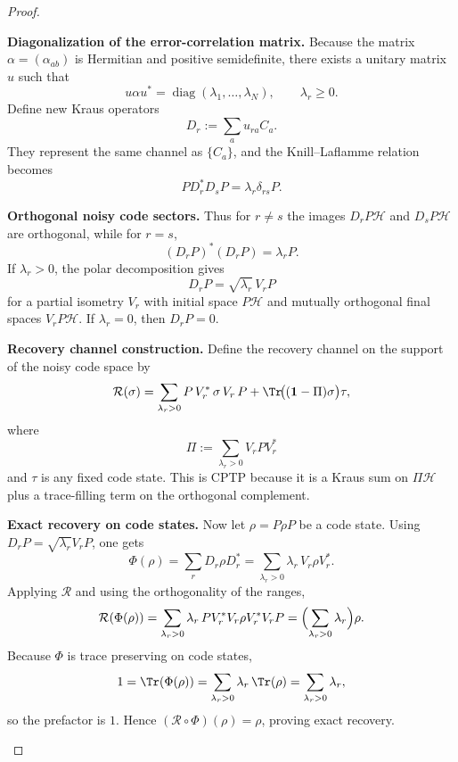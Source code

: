 \documentclass[12pt,a4paper]{article}
\begin{document}
\begin{proof}
\begin{proofsteps}

\item \textbf{Diagonalization of the error-correlation matrix.}
Because the matrix \(\alpha=(\alpha_{ab})\) is Hermitian and positive semidefinite, there exists a unitary matrix \(u\) such that
\[
u\alpha u^*=\operatorname{diag}(\lambda_1,\dots,\lambda_N),
\qquad
\lambda_r\ge 0.
\]
Define new Kraus operators
\[
D_r:=\sum_a u_{ra}C_a.
\]
They represent the same channel as \(\{C_a\}\), and the Knill--Laflamme relation becomes
\[
PD_r^*D_sP=\lambda_r\delta_{rs}P.
\]

\item \textbf{Orthogonal noisy code sectors.}
Thus for \(r\neq s\) the images \(D_rP\mathcal H\) and \(D_sP\mathcal H\) are orthogonal, while for \(r=s\),
\[
(D_rP)^*(D_rP)=\lambda_r P.
\]
If \(\lambda_r>0\), the polar decomposition gives
\[
D_rP=\sqrt{\lambda_r}\,V_rP
\]
for a partial isometry \(V_r\) with initial space \(P\mathcal H\) and mutually orthogonal final spaces \(V_rP\mathcal H\).
If \(\lambda_r=0\), then \(D_rP=0\).


\item \textbf{Recovery channel construction.}
Define the recovery channel on the support of the noisy code space by
\[
\mathcal R(\sigma)
=
\sum_{\lambda_r>0} P\,V_r^*\,\sigma\,V_r\,P
+
\Tr\!\bigl((\mathbf 1-\Pi)\sigma\bigr)\tau,
\]
where
\[
\Pi:=\sum_{\lambda_r>0}V_rPV_r^*
\]
and \(\tau\) is any fixed code state.
This is CPTP because it is a Kraus sum on \(\Pi\mathcal H\) plus a trace-filling term on the orthogonal complement.


\item \textbf{Exact recovery on code states.}
Now let \(\rho=P\rho P\) be a code state.
Using \(D_rP=\sqrt{\lambda_r}V_rP\), one gets
\[
\Phi(\rho)=\sum_r D_r\rho D_r^*
=
\sum_{\lambda_r>0}\lambda_r\,V_r\rho V_r^*.
\]
Applying \(\mathcal R\) and using the orthogonality of the ranges,
\[
\mathcal R(\Phi(\rho))
=
\sum_{\lambda_r>0}\lambda_r\,P V_r^*V_r \rho V_r^*V_r P
=
\Bigl(\sum_{\lambda_r>0}\lambda_r\Bigr)\rho.
\]
Because \(\Phi\) is trace preserving on code states,
\[
1=\Tr(\Phi(\rho))=\sum_{\lambda_r>0}\lambda_r\,\Tr(\rho)=\sum_{\lambda_r>0}\lambda_r,
\]
so the prefactor is \(1\).
Hence \((\mathcal R\circ\Phi)(\rho)=\rho\), proving exact recovery.
\end{proofsteps}

\end{proof}
\end{document}
